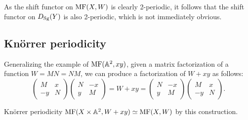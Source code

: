 \begin{remark}{}{}
    As the shift functor on $\operatorname{MF}(X,W)$ is clearly 2-periodic, it follows that
    the shift functor on $D_{\mathrm{Sg}}(Y)$ is also 2-periodic, which is not immediately
    obvious.
\end{remark}

\subsection{Kn\"orrer periodicity}\label{subsec:knorrer}

Generalizing the example of $\operatorname{MF}(\mathbb{A}^2,xy)$, given a matrix factorization of a
function $W=MN=NM$, we can produce a factorization of $W+xy$ as follows:
\begin{equation*}
    \begin{pmatrix}
        M & x \\ -y & N
    \end{pmatrix}\begin{pmatrix}
        N & -x \\ y & M
    \end{pmatrix}
        = W+xy =
    \begin{pmatrix}
        N & -x \\ y & M
    \end{pmatrix}\begin{pmatrix}
        M & x \\ -y & N
    \end{pmatrix}.
\end{equation*}

\begin{theorem}{Kn\"orrer periodicity}{}
    $\operatorname{MF}(X\times\mathbb{A}^2,W+xy)\simeq\operatorname{MF}(X,W)$ by this construction.
\end{theorem}

